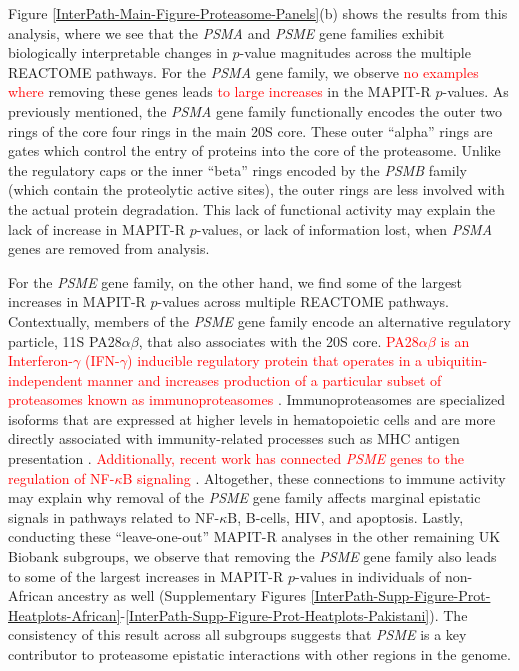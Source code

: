 \documentclass[10pt]{article}
\begin{document}
Figure \ref{InterPath-Main-Figure-Proteasome-Panels}(b) shows the results from this analysis, where we see that the \textit{PSMA} and \textit{PSME} gene families exhibit biologically interpretable changes in $p$-value magnitudes across the multiple REACTOME pathways. For the \textit{PSMA} gene family, we observe \textcolor{red}{no examples where} removing these genes leads \textcolor{red}{to large increases} in the MAPIT-R $p$-values. As previously mentioned, the \textit{PSMA} gene family functionally encodes the outer two rings of the core four rings in the main 20S core. These outer ``alpha'' rings are gates which control the entry of proteins into the core of the proteasome. Unlike the regulatory caps or the inner ``beta'' rings encoded by the \textit{PSMB} family (which contain the proteolytic active sites), the outer rings are less involved with the actual protein degradation. This lack of functional activity may explain the lack of increase in MAPIT-R $p$-values, or lack of information lost, when \textit{PSMA} genes are removed from analysis. 
 
For the \textit{PSME} gene family, on the other hand, we find some of the largest increases in MAPIT-R $p$-values across multiple REACTOME pathways. Contextually, members of the \textit{PSME} gene family encode an alternative regulatory particle, 11S PA28$\alpha\beta$, that also associates with the 20S core. \textcolor{red}{PA28$\alpha\beta$ is an Interferon-$\gamma$ (IFN-$\gamma$) inducible regulatory protein that operates in a ubiquitin-independent manner and increases production of a particular subset of proteasomes known as immunoproteasomes} \cite{Groettrup1996,de2011,Raule2014,Murata2018}. Immunoproteasomes are specialized isoforms that are expressed at higher levels in hematopoietic cells and are more directly associated with immunity-related processes such as MHC antigen presentation \cite{Ferrington2012,Basler2013,McCarthy2015}. \textcolor{red}{Additionally, recent work has connected \textit{PSME} genes to the regulation of NF-$\kappa$B signaling} \cite{Sun2016,Mitchell2019}. Altogether, these connections to immune activity may explain why removal of the \textit{PSME} gene family affects marginal epistatic signals in pathways related to NF-$\kappa$B, B-cells, HIV, and apoptosis. Lastly, conducting these ``leave-one-out'' MAPIT-R analyses in the other remaining UK Biobank subgroups, we observe that removing the \textit{PSME} gene family also leads to some of the largest increases in MAPIT-R $p$-values in individuals of non-African ancestry as well (Supplementary Figures \ref{InterPath-Supp-Figure-Prot-Heatplots-African}-\ref{InterPath-Supp-Figure-Prot-Heatplots-Pakistani}). The consistency of this result across all subgroups suggests that \textit{PSME} is a key contributor to proteasome epistatic interactions with other regions in the genome. 
\end{document}

